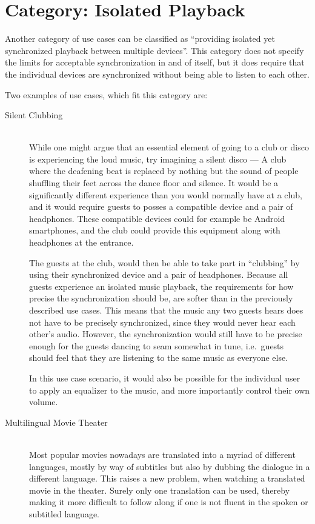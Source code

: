 \section{Category: Isolated Playback}\label{sec:category_isolated_playback}
Another category of use cases can be classified as \enquote{providing isolated yet synchronized playback between multiple devices}.
This category does not specify the limits for acceptable synchronization in and of itself, but it does require that the individual devices are synchronized without being able to listen to each other.

Two examples of use cases, which fit this category are:
\begin{description}
    \item[Silent Clubbing] \hfill\\
        While one might argue that an essential element of going to a club or disco is experiencing the loud music, try imagining a silent disco ---
        A club where the deafening beat is replaced by nothing but the sound of people shuffling their feet across the dance floor and silence.
        It would be a significantly different experience than you would normally have at a club, and it would require guests to posses a compatible device and a pair of headphones.
        These compatible devices could for example be Android smartphones, and the club could provide this equipment along with headphones at the entrance.

        The guests at the club, would then be able to take part in \enquote{clubbing} by using their synchronized device and a pair of headphones.
        Because all guests experience an isolated music playback, the requirements for how precise the synchronization should be, are softer than in the previously described use cases.
        This means that the music any two guests hears does not have to be precisely synchronized, since they would never hear each other's audio.
        However, the synchronization would still have to be precise enough for the guests dancing to seam somewhat in tune, i.e.~guests should feel that they are listening to the same music as everyone else.

        In this use case scenario, it would also be possible for the individual user to apply an equalizer to the music, and more importantly control their own volume.
    \item[Multilingual Movie Theater] \hfill\\
        Most popular movies nowadays are translated into a myriad of different languages, mostly by way of subtitles but also by dubbing the dialogue in a different language.
        This raises a new problem, when watching a translated movie in the theater.
        Surely only one translation can be used, thereby making it more difficult to follow along if one is not fluent in the spoken or subtitled language.


\end{description}
